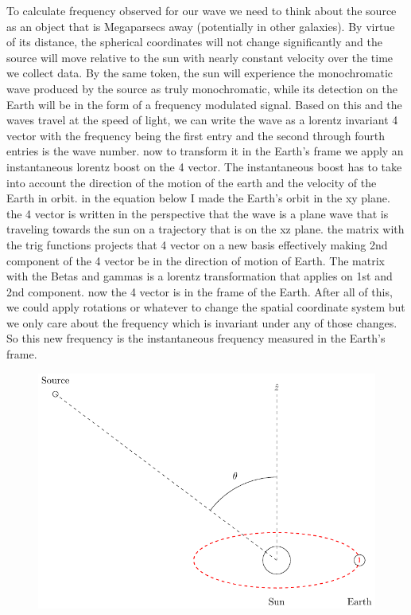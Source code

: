 \documentclass[onecolumn, groupedaddress, 10pt]{revtex4-1}
\begin{document}
To calculate frequency observed for our wave we need to think about the source as an object that is Megaparsecs away (potentially in other galaxies).  By virtue of its distance, the spherical coordinates will not change significantly and the source will move relative to the sun with nearly constant velocity over the time we collect data. By the same token, the sun will experience the monochromatic wave produced by the source as truly monochromatic, while its detection on the Earth will be in the form of a frequency modulated signal.  Based on this and the waves travel at the speed of light, we can write the wave as a lorentz invariant 4 vector with the frequency being the first entry and the second through fourth entries is the wave number. now to transform it in the Earth's frame we apply an instantaneous lorentz boost on the 4 vector.  The instantaneous boost has to take into account the direction of the motion of the earth and the velocity of the Earth in orbit. in the equation below I made the Earth's orbit in the xy plane. the 4 vector is written in the perspective that the wave is a plane wave that is traveling towards the sun on a trajectory that is on the xz plane. the matrix with the trig functions projects that 4 vector on a new basis effectively making 2nd component of the 4 vector be in the direction of motion of Earth. The matrix with the Betas and gammas is a lorentz transformation that applies on 1st and 2nd component. now the 4 vector is in the frame of the Earth. After all of this, we could apply rotations or whatever to change the spatial coordinate system but we only care about the frequency which is invariant under any of those changes. So this new frequency is the instantaneous frequency measured in the Earth's frame.

\begin{figure}[ht]
	\centering
	\includegraphics[width=.75\linewidth]{earthMotionModulationFigure.pdf}
	\caption{\label{fig:earthMotionModulationFigure}}
\end{figure}
\end{document}
